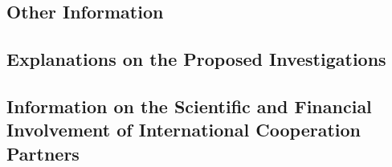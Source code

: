 \documentclass{scrartcl}
\begin{document}
\subsection{Other Information}
\subsection{Explanations on the Proposed Investigations}
\subsection{Information on the Scientific and Financial Involvement of International Cooperation Partners}




 




%





\end{document}
